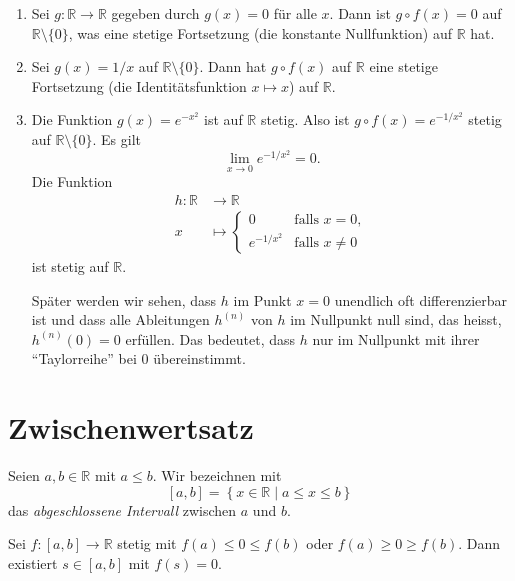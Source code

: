 \documentclass[../main.tex]{subfiles}
\begin{document}
\begin{examples}
  \leavevmode
  \begin{enumerate}[(1)]
    \item Sei $g \colon \mathbb{R} \to \mathbb{R}$ gegeben
      durch $g(x) = 0$ für alle $x$. Dann ist
      $g \circ f(x) = 0$ auf $\mathbb{R} \setminus \{0\}$,
      was eine stetige Fortsetzung (die konstante Nullfunktion)
      auf $\mathbb{R}$ hat.
    \item Sei $g(x) = 1/x$ auf $\mathbb{R} \setminus \{0\}$.
      Dann hat $g \circ f(x)$ auf $\mathbb{R}$ 
      eine stetige Fortsetzung (die Identitätsfunktion $x
      \mapsto x$) auf $\mathbb{R}$.
    \item Die Funktion $g(x) = e^{-x^2}$ ist auf $\mathbb{R}$ 
      stetig.
      Also ist $g \circ f(x) = e^{-1/x^2}$ stetig
      auf $\mathbb{R} \setminus \{0\}$.
      Es gilt
      \[
        \lim_{x \to 0}e^{-1/x^2} = 0.
      \]
      Die Funktion
      \begin{align*}
        h \colon \mathbb{R} & \to \mathbb{R} \\
        x & \mapsto 
        \begin{cases}
          0 & \text{falls } x = 0, \\
          e^{-1/x^2} & \text{falls } x \neq 0
        \end{cases}
      \end{align*}
      ist stetig auf $\mathbb{R}$.

      Später werden wir sehen,
      dass $h$ im Punkt $x = 0$ unendlich oft differenzierbar
      ist und dass alle Ableitungen $h^{(n)}$ von $h$
      im Nullpunkt null sind, das heisst,
      $h^{(n)}(0) = 0$ erfüllen.
      Das bedeutet, dass $h$ nur im Nullpunkt
      mit ihrer ``Taylorreihe'' bei $0$
      übereinstimmt.
  \end{enumerate}
\end{examples}


\section{Zwischenwertsatz}\label{sec:zwischenwertsatz}

Seien $a, b \in \mathbb{R}$ mit $a \leq b$.
Wir bezeichnen mit
\[
  [a, b] = \left\{x \in \mathbb{R} \mid a \leq x \leq b\right\}
\]
das \emph{abgeschlossene Intervall} zwischen $a$ und $b$.

\begin{theorem}\label{thm:pre-zwischen}
  Sei $f \colon [a, b] \to \mathbb{R}$ stetig
  mit $f(a) \leq 0 \leq f(b)$ oder
  $f (a) \geq 0 \geq f(b)$. Dann existiert $s \in [a, b]$ 
  mit $f(s) = 0$.
\end{theorem}
\end{document}
